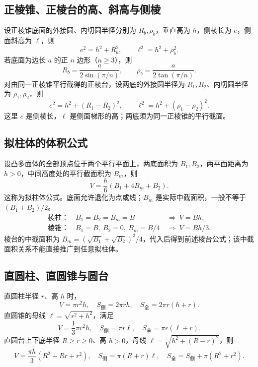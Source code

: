\documentclass[../main.tex]{subfiles}
\begin{document}
\subsection{正棱锥、正棱台的高、斜高与侧棱}
设正棱锥底面的外接圆、内切圆半径分别为 $R_b,\rho_b$，垂直高为 $h$，侧棱长为 $e$，侧面斜高为 $\ell$，则
\[
e^2=h^2+R_b^2,\qquad \ell^2=h^2+\rho_b^2.
\]
若底面为边长 $a$ 的正 $n$ 边形（$n\ge3$），则
\[
R_b=\frac{a}{2\sin(\pi/n)},\qquad
\rho_b=\frac{a}{2\tan(\pi/n)}.
\]
对由同一正棱锥平行截得的正棱台，设两底的外接圆半径为 $R_1,R_2$、内切圆半径为 $\rho_1,\rho_2$，则
\[
e^2=h^2+(R_1-R_2)^2,\qquad
\ell^2=h^2+(\rho_1-\rho_2)^2.
\]
这里 $e$ 是侧棱长，$\ell$ 是侧面梯形的高；两底须为同一正棱锥的平行截面。
\subsection{拟柱体的体积公式}
设凸多面体的全部顶点位于两个平行平面上，两底面积为 $B_1,B_2$，两平面距离为 $h>0$，中间高度处的平行截面积为 $B_m$，则
\[
V=\frac h6(B_1+4B_m+B_2).
\]
这称为拟柱体公式。底面允许退化为点或线；$B_m$ 是实际中截面积，一般不等于 $(B_1+B_2)/2$。
\begin{align*}
\text{棱柱：}\quad B_1=B_2=B_m=B&\ \Longrightarrow\ V=Bh,\\
\text{棱锥：}\quad B_1=B,\ B_2=0,\ B_m=B/4&\ \Longrightarrow\ V=Bh/3.
\end{align*}
棱台的中截面积为 $B_m=(\sqrt{B_1}+\sqrt{B_2})^2/4$，代入后得到前述棱台公式；该中截面积关系不能直接推广到任意拟柱体。
\subsection{直圆柱、直圆锥与圆台}
直圆柱半径 $r$、高 $h$ 时，
\[
V=\pi r^2h,\quad S_{\text{侧}}=2\pi rh,\quad S_{\text{全}}=2\pi r(h+r).
\]
直圆锥的母线 $\ell=\sqrt{r^2+h^2}$，满足
\[
V=\frac13\pi r^2h,\quad S_{\text{侧}}=\pi r\ell,\quad S_{\text{全}}=\pi r(\ell+r).
\]
直圆台上下底半径 $R\ge r\ge0$、高 $h>0$，母线 $\ell=\sqrt{h^2+(R-r)^2}$，则
\[
V=\frac{\pi h}3(R^2+Rr+r^2),\quad
S_{\text{侧}}=\pi(R+r)\ell,\quad S_{\text{全}}=S_{\text{侧}}+\pi(R^2+r^2).
\]
\end{document}
